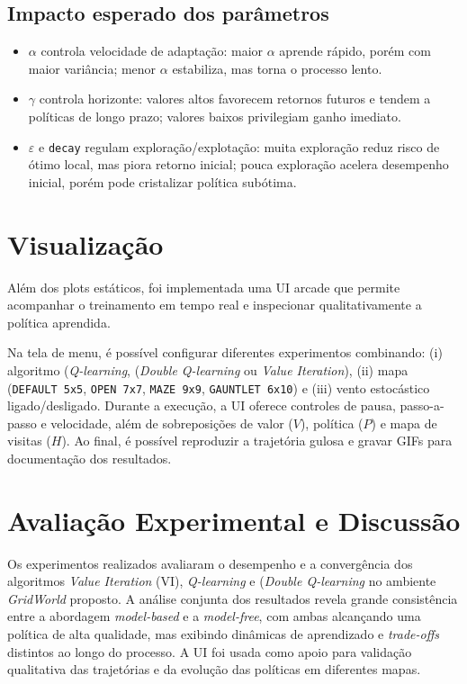 \documentclass[a4paper,11pt]{article}
\begin{document}
\subsection*{Impacto esperado dos parâmetros}

\begin{itemize}
    \item $\alpha$ controla velocidade de adaptação: maior $\alpha$ aprende rápido, porém com maior variância; menor $\alpha$ estabiliza, mas torna o processo lento.
    \item $\gamma$ controla horizonte: valores altos favorecem retornos futuros e tendem a políticas de longo prazo; valores baixos privilegiam ganho imediato.
    \item $\varepsilon$ e \texttt{decay} regulam exploração/explotação: muita exploração reduz risco de ótimo local, mas piora retorno inicial; pouca exploração acelera desempenho inicial, porém pode cristalizar política subótima.
\end{itemize}

\section{Visualização}

Além dos plots estáticos, foi implementada uma UI arcade que permite acompanhar o treinamento em tempo real e inspecionar qualitativamente a política aprendida.

Na tela de menu, é possível configurar diferentes experimentos combinando: (i) algoritmo (\textit{Q-learning}, (\textit{Double Q-learning} ou \textit{Value Iteration}), (ii) mapa (\texttt{DEFAULT 5x5}, \texttt{OPEN 7x7}, \texttt{MAZE 9x9}, \texttt{GAUNTLET 6x10}) e (iii) vento estocástico ligado/desligado. Durante a execução, a UI oferece controles de pausa, passo-a-passo e velocidade, além de sobreposições de valor ($V$), política ($P$) e mapa de visitas ($H$). Ao final, é possível reproduzir a trajetória gulosa e gravar GIFs para documentação dos resultados.

\section{Avaliação Experimental e Discussão}

Os experimentos realizados avaliaram o desempenho e a convergência dos algoritmos \textit{Value Iteration} (VI), \textit{Q-learning} e (\textit{Double Q-learning} no ambiente \textit{GridWorld} proposto. A análise conjunta dos resultados revela grande consistência entre a abordagem \emph{model-based} e a \emph{model-free}, com ambas alcançando uma política de alta qualidade, mas exibindo dinâmicas de aprendizado e \textit{trade-offs} distintos ao longo do processo. A UI foi usada como apoio para validação qualitativa das trajetórias e da evolução das políticas em diferentes mapas.
\end{document}
